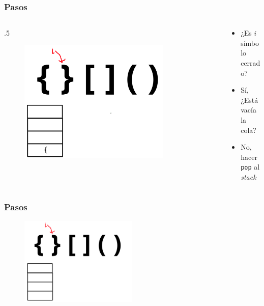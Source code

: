 \documentclass[17pt, t, lualatex]{beamer}
\newcommand{\cppinline}[1]{\lstinline[style=cppstyle]!#1!}
\begin{document}
\begin{frame}
  \frametitle{Pasos}

  \begin{columns}
    \begin{column}{.5\textwidth}
  \begin{figure}[h]
    \centering
    \includegraphics[width=0.8\textwidth]{img/Problema1-4.png}
  \end{figure}
    \end{column}

    \begin{column}{.5\textwidth}
      \begin{itemize}
        \item ¿Es $i$ símbolo cerrado?
        \item Sí, ¿Está vacía la cola?
        \item No, hacer \cppinline{pop} al \textit{stack}
      \end{itemize}
    \end{column}
  \end{columns}

\end{frame}

\begin{frame}
  \frametitle{Pasos}
  \begin{figure}[h]
    \centering
    \includegraphics[width=0.5\textwidth]{img/Problema1-5.png}
  \end{figure}
\end{frame}
\end{document}
